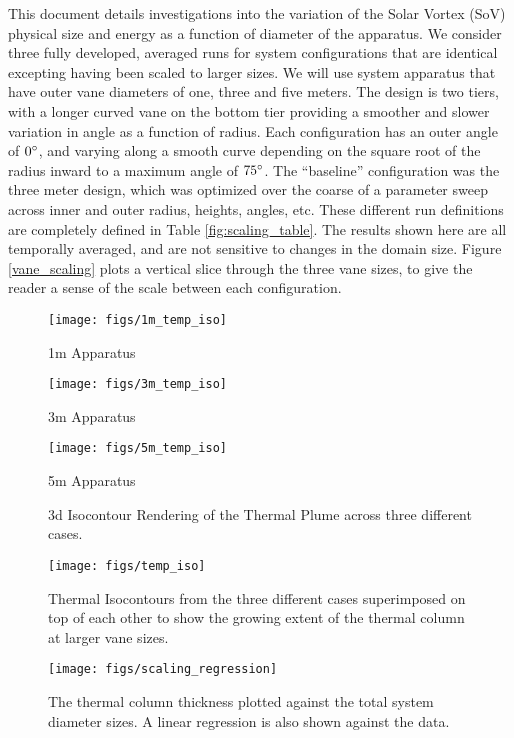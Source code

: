\documentclass[english]{article}
\begin{document}
This document details investigations into the variation of the Solar
Vortex (SoV) physical size and energy as a function of diameter of the
apparatus. We consider three fully developed, averaged runs for system
configurations that are identical excepting having been scaled to larger
sizes. We will use system apparatus that have outer vane diameters of
one, three and five meters. The design is two tiers, with a longer
curved vane on the bottom tier providing a smoother and slower variation
in angle as a function of radius. Each configuration has an outer angle
of $0\degree$, and varying along a smooth curve depending on the square
root of the radius inward to a maximum angle of $75\degree$. The
``baseline'' configuration was the three meter design, which was
optimized over the coarse of a parameter sweep across inner and outer
radius, heights, angles, etc. These different run definitions are
completely defined in Table \ref{fig:scaling_table}. The results shown
here are all temporally averaged, and are not sensitive to changes in
the domain size. 
%
%
Figure \ref{vane_scaling} plots a vertical slice through the three vane
sizes, to give the reader a sense of the scale between each configuration.

\begin{figure}[!htb]
  \texttt{[image: figs/1m\_temp\_iso]}
  \caption*{1m Apparatus}\label{fig:1m_scaling}
\endminipage\hfill
{}
  \texttt{[image: figs/3m\_temp\_iso]}
  \caption*{3m Apparatus}\label{fig:3m_scaling}
\endminipage\hfill
{}%
  \texttt{[image: figs/5m\_temp\_iso]}
  \caption*{5m Apparatus}\label{fig:5m_scaling}
\endminipage
\caption{3d Isocontour Rendering of the Thermal Plume across three different cases.}
\label{fig:iso}
\end{figure}


\begin{figure}[!htb]
  \begin{center}
    \texttt{[image: figs/temp\_iso]}
    \caption{Thermal Isocontours from the three different cases superimposed 
      on top of each other to show the growing extent of the thermal column at larger vane sizes. }
    \label{fig:scaling_slice}
  \end{center}
\end{figure}

\begin{figure}[!htb]
  \begin{center}
    \texttt{[image: figs/scaling\_regression]}
    \caption{The thermal column thickness plotted against the total system diameter sizes. A linear regression is also shown against the data.}
    \label{fig:scaling_reg}
  \end{center}
\end{figure}
\end{document}
